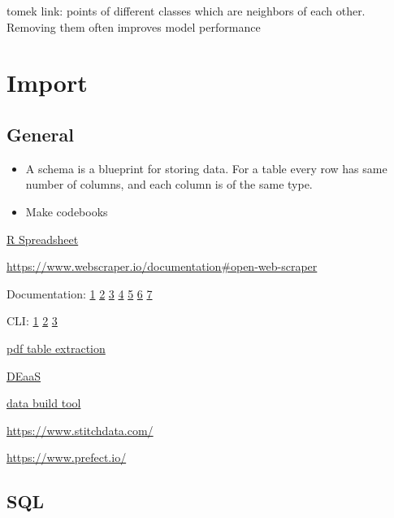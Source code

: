 \documentclass[]{book}
\begin{document}
tomek link: points of different classes which are neighbors of each
other. Removing them often improves model performance

\section{Import}\label{import-1}

\subsection{General}\label{general-1}

\begin{itemize}
\item
  A schema is a blueprint for storing data. For a table every row has
  same number of columns, and each column is of the same type.
\item
  Make codebooks
\end{itemize}

\href{https://www.jamovi.org/}{R Spreadsheet}

\url{https://www.webscraper.io/documentation\#open-web-scraper}

Documentation: \href{http://databasenotetaker.com/}{1} \textbar{}
\href{https://dataedo.com/}{2} \textbar{}
\href{https://www.apexsql.com/sql-tools-doc.aspx}{3} \textbar{}
\href{https://techwriter.me/best-practices-guide/documenting-databases.aspx}{4}
\textbar{}
\href{http://help.osf.io/m/bestpractices/l/618767-how-to-make-a-data-dictionary}{5}
\textbar{}
\href{https://dataedo.com/blog/different-types-of-tools-you-can-use-to-document-your-database}{6}
\textbar{} \href{https://drawsql.app/\#features}{7}

CLI:
\href{http://bconnelly.net/working-with-csvs-on-the-command-line/\#taking-a-peek-at-the-data-set}{1}
\textbar{}
\href{https://opensource.com/article/17/2/command-line-tools-data-analysis-linux?sc_cid=701600000011jJVAAY}{2}
\textbar{}
\href{http://alexisperrier.com/shell/2017/11/07/command-line-data-scientist.html}{3}

\href{https://tabula.technology}{pdf table extraction}

\href{https://www.astronomer.io/}{DEaaS}

\href{https://www.getdbt.com/}{data build tool}

\url{https://www.stitchdata.com/}

\url{https://www.prefect.io/}

\subsection{SQL}\label{sql}
\end{document}

